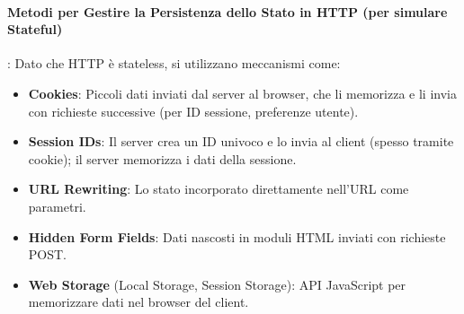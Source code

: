 \paragraph{Metodi per Gestire la Persistenza dello Stato in HTTP (per simulare Stateful)}:
Dato che HTTP è stateless, si utilizzano meccanismi come:
\begin{itemize}
    \item \textbf{Cookies}: Piccoli dati inviati dal server al browser, che li memorizza e li invia con richieste successive (per ID sessione, preferenze utente).
    \item \textbf{Session IDs}: Il server crea un ID univoco e lo invia al client (spesso tramite cookie); il server memorizza i dati della sessione.
    \item \textbf{URL Rewriting}: Lo stato incorporato direttamente nell'URL come parametri.
    \item \textbf{Hidden Form Fields}: Dati nascosti in moduli HTML inviati con richieste POST.
    \item \textbf{Web Storage} (Local Storage, Session Storage): API JavaScript per memorizzare dati nel browser del client.
\end{itemize}